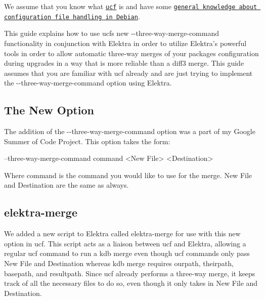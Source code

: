 We assume that you know what \href{https://packages.debian.org/sid/ucf}{\tt ucf} is and have some \href{https://wiki.debian.org/ConfigPackages}{\tt general knowledge about configuration file handling in Debian}.

This guide explains how to use ucf\textquotesingle{}s new {\ttfamily -\/-\/three-\/way-\/merge-\/command} functionality in conjunction with Elektra in order to utilize Elektra’s powerful tools in order to allow automatic three-\/way merges of your package\textquotesingle{}s configuration during upgrades in a way that is more reliable than a diff3 merge. This guide assumes that you are familiar with ucf already and are just trying to implement the {\ttfamily -\/-\/three-\/way-\/merge-\/command} option using Elektra.

\subsection*{The New Option}

The addition of the {\ttfamily -\/-\/three-\/way-\/merge-\/command} option was a part of my Google Summer of Code Project. This option takes the form\+:


\begin{DoxyCode}
--three-way-merge-command command <New File> <Destination>
\end{DoxyCode}


Where {\ttfamily command} is the command you would like to use for the merge. {\ttfamily New File} and {\ttfamily Destination} are the same as always.

\subsection*{elektra-\/merge}

We added a new script to Elektra called elektra-\/merge for use with this new option in ucf. This script acts as a liaison between ucf and Elektra, allowing a regular ucf command to run a {\ttfamily kdb merge} even though ucf commands only pass {\ttfamily New File} and {\ttfamily Destination} whereas kdb merge requires {\ttfamily ourpath}, {\ttfamily theirpath}, {\ttfamily basepath}, and {\ttfamily resultpath}. Since ucf already performs a three-\/way merge, it keeps track of all the necessary files to do so, even though it only takes in {\ttfamily New File} and {\ttfamily Destination}.

